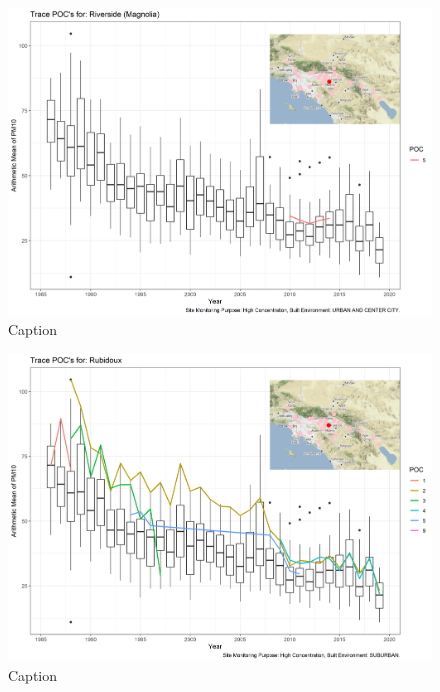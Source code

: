 \begin{figure}
    \centering
    \includegraphics[width = \textwidth]{Figures/IndividualSiteTraces/TracePOC_Riverside (Magnolia).png}
    \caption{Caption}
    \label{fig:my_label}
\end{figure}

\begin{figure}
    \centering
    \includegraphics[width = \textwidth]{Figures/IndividualSiteTraces/TracePOC_Rubidoux.png}
    \caption{Caption}
    \label{fig:my_label}
\end{figure}

